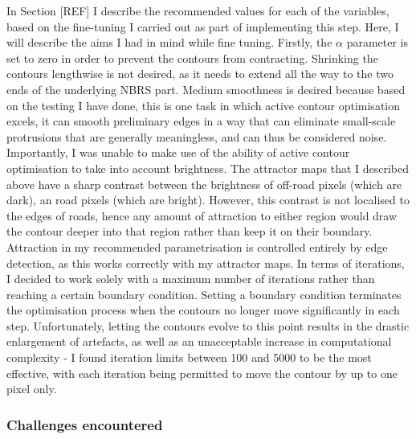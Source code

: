 In Section [REF] I describe the recommended values for each of the variables, based on the fine-tuning I carried out as part of implementing this step. Here, I will describe the aims I had in mind while fine tuning. Firstly, the $\alpha$ parameter is set to zero in order to prevent the contours from contracting. Shrinking the contours lengthwise is not desired, as it needs to extend all the way to the two ends of the underlying NBRS part. Medium smoothness is desired because based on the testing I have done, this is one task in which active contour optimisation excels, it can smooth preliminary edges in a way that can eliminate small-scale protrusions that are generally meaningless, and can thus be considered noise. Importantly, I was unable to make use of the ability of active contour optimisation to take into account brightness. The attractor maps that I described above have a sharp contrast between the brightness of off-road pixels (which are dark), an road pixels (which are bright). However, this contrast is not localised to the edges of roads, hence any amount of attraction to either region would draw the contour deeper into that region rather than keep it on their boundary. Attraction in my recommended parametrisation is controlled entirely by edge detection, as this works correctly with my attractor maps. In terms of iterations, I decided to work solely with a maximum number of iterations rather than reaching a certain boundary condition. Setting a boundary condition terminates the optimisation process when the contours no longer move significantly in each step. Unfortunately, letting the contours evolve to this point results in the drastic enlargement of artefacts, as well as an unacceptable increase in computational complexity - I found iteration limits between 100 and 5000 to be the most effective, with each iteration being permitted to move the contour by up to one pixel only.

\subsubsection{Challenges encountered}

